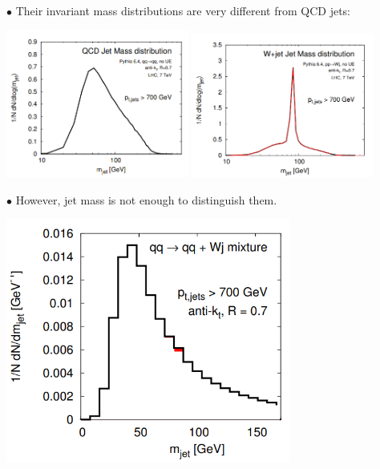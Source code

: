 \documentclass[9pt,a4paper,unknownkeysallowed,xcolor=dvipsnames,aspectratio=43]{beamer}
\begin{document}
%
%
\begin{frame}

{\color{darkred}\Large$\bullet$} Their invariant mass distributions are very different from QCD jets:
\vspace{2mm}
\begin{center}
\includegraphics[width=0.45\textwidth]{05/jetmass.PNG}
\includegraphics[width=0.45\textwidth]{05/Wjetmass.PNG}
\end{center}
\end{frame}
%
%
\begin{frame}

{\color{darkred}\Large$\bullet$} However, jet mass is not enough to distinguish them.
\vspace{2mm}
\begin{center}
\includegraphics[width=0.7\textwidth]{05/WQCDjets.PNG}
\end{center}
\end{frame}
\end{document}
